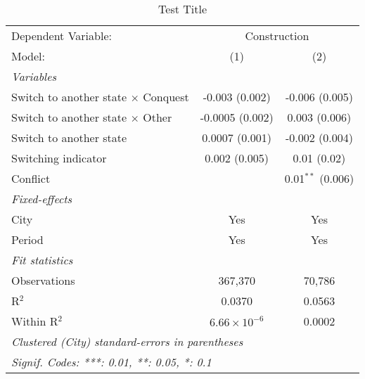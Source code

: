 \begin{table}[htbp]
   \caption{\label{tab:baseline_1y} Test Title}
   \centering
   \begin{tabular}{lcc}
      \tabularnewline \midrule \midrule
      Dependent Variable: & \multicolumn{2}{c}{Construction}\\
      Model:                                     & (1)                   & (2)\\  
      \midrule
      \emph{Variables}\\
      Switch to another state $\times$ Conquest  & -0.003 (0.002)        & -0.006 (0.005)\\   
      Switch to another state $\times$ Other     & -0.0005 (0.002)       & 0.003 (0.006)\\   
      Switch to another state                    & 0.0007 (0.001)        & -0.002 (0.004)\\   
      Switching indicator                        & 0.002 (0.005)         & 0.01 (0.02)\\   
      Conflict                                   &                       & 0.01$^{**}$ (0.006)\\   
      \midrule
      \emph{Fixed-effects}\\
      City                                       & Yes                   & Yes\\  
      Period                                     & Yes                   & Yes\\  
      \midrule
      \emph{Fit statistics}\\
      Observations                               & 367,370               & 70,786\\  
      R$^2$                                      & 0.0370                & 0.0563\\  
      Within R$^2$                               & $6.66\times 10^{-6}$  & 0.0002\\  
      \midrule \midrule
      \multicolumn{3}{l}{\emph{Clustered (City) standard-errors in parentheses}}\\
      \multicolumn{3}{l}{\emph{Signif. Codes: ***: 0.01, **: 0.05, *: 0.1}}\\
   \end{tabular}
\end{table}
